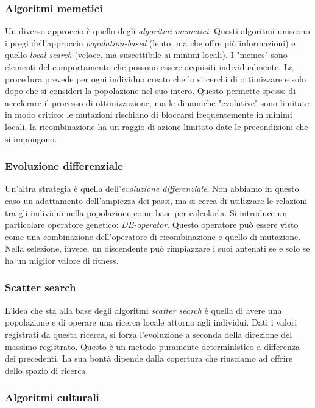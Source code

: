 \documentclass[10pt,a4paper]{article}
\begin{document}
\subsubsection{Algoritmi memetici}

Un diverso approccio è quello degli \emph{algoritmi memetici}. Questi algoritmi uniscono i pregi dell'approccio \emph{population-based} (lento, ma che offre più informazioni) e quello \emph{local search} (veloce, ma suscettibile ai minimi locali). I "memes" sono elementi del comportamento che possono essere acquisiti individualmente. La procedura prevede per ogni individuo creato che lo si cerchi di ottimizzare e solo dopo che si consideri la popolazione nel suo intero. Questo permette spesso di accelerare il processo di ottimizzazione, ma le dinamiche "evolutive" sono limitate in modo critico: le mutazioni rischiano di bloccarsi frequentemente in minimi locali, la ricombinazione ha un raggio di azione limitato date le precondizioni che si impongono. 

\subsubsection{Evoluzione differenziale}

Un'altra strategia è quella dell'\emph{evoluzione differenziale}. Non abbiamo in questo caso un adattamento dell'ampiezza dei passi, ma si cerca di utilizzare le relazioni tra gli individui nella popolazione come base per calcolarla. Si introduce un particolare operatore genetico: \emph{DE-operator}. Questo operatore può essere visto come una combinazione dell'operatore di ricombinazione e quello di mutazione. Nella selezione, invece, un discendente può rimpiazzare i suoi antenati se e solo se ha un miglior valore di fitness. 

\subsubsection{Scatter search}

L'idea che sta alla base degli algoritmi \emph{scatter search} è quella di avere una popolazione e di operare una ricerca locale attorno agli individui. Dati i valori registrati da questa ricerca, si forza l'evoluzione a seconda della direzione del massimo registrato. Questo è un metodo puramente deterministico a differenza dei precedenti. La sua bontà dipende dalla copertura che riusciamo ad offrire dello spazio di ricerca. 

\subsubsection{Algoritmi culturali}
\end{document}
